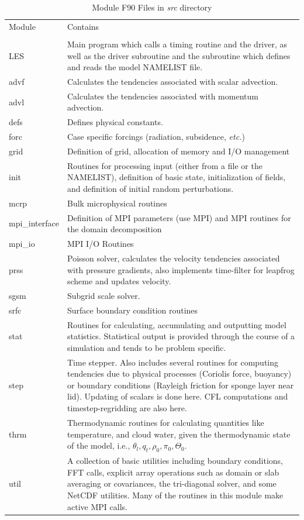 \documentclass[11pt,a4paper]{article}
\begin{document}
\begin{table}
\begin{center}
\caption{Module F90 Files in \emph{src} directory} \label{tbl:modules}
\begin{tabular}[htb]{p{0.15\linewidth}p{0.85\linewidth}}
\hline \hline Module & Contains \\ \\  \hline
LES &  Main program which calls a timing
routine and the driver, as well as the driver subroutine and the
subroutine which defines and reads the model NAMELIST file. 
\\ advf &  Calculates the tendencies associated with scalar advection.
\\ advl &  Calculates the tendencies associated with momentum advection.
\\ defs &  Defines physical constants.
\\ forc &  Case specific forcings (radiation, subsidence, \emph{etc.})
\\ grid &  Definition of grid, allocation of memory and I/O management
\\ init &  Routines for processing input (either from
a file or the NAMELIST), definition of basic state, initialization of
fields, and definition of initial random perturbations.
\\ mcrp &  Bulk microphysical routines
\\ mpi\_interface & Definition of MPI parameters (use MPI) and MPI
routines for the domain decomposition
\\ mpi\_io & MPI I/O Routines
\\ prss &  Poisson solver, calculates the velocity tendencies
associated with pressure gradients, also implements time-filter for
leapfrog scheme and updates velocity.
\\ sgsm &  Subgrid scale solver.
\\ srfc &  Surface boundary condition  routines
\\stat &  Routines for calculating, accumulating and outputting model
statistics.  Statistical output is provided through the course of a
simulation and tends to be problem specific.
\\step &  Time stepper.  Also includes several routines for computing
tendencies due to physical processes (Coriolis force, buoyancy) or
boundary conditions (Rayleigh friction for sponge layer near lid).
Updating of scalars is done here. CFL computations and
timestep-regridding are also here.
\\thrm & Thermodynamic routines for calculating
quantities like temperature, and cloud water, given the thermodynamic
state of the model, i.e., $\theta_l,q_t,\rho_0,\pi_0,\Theta_0.$
\\util & A collection of basic utilities including
boundary conditions, FFT calls, explicit array operations such as
domain or slab averaging or covariances, the tri-diagonal solver, and
some NetCDF utilities.  Many of the routines in this module make
active MPI calls. \\ \hline
\end{tabular}
\end{center}
\end{table}
\end{document}
